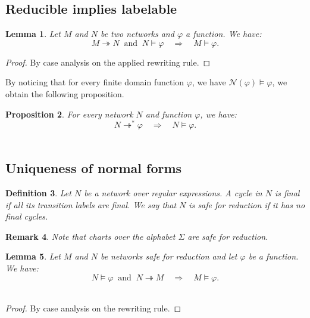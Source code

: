 \documentclass{article}
\newtheorem{definition}{Definition}[section]
\newtheorem{lemma}[definition]{Lemma}
\newtheorem{proposition}[definition]{Proposition}
\newtheorem{corollary}[definition]{Corollary}
\newtheorem{remark}[definition]{Remark}
\newcommand{\milner}[1]{\mathcal{M}(#1)}
\begin{document}
 \subsection{Reducible implies labelable}\label{sec:reducible-implies-decorable}
   \begin{lemma}
     Let $M$ and $N$ be two networks and $\varphi$ a function. We have:
     \[ M\twoheadrightarrow N \ \text{ and }\ N \models \varphi \quad \Longrightarrow \quad M \models \varphi. \]
      \end{lemma}
      \begin{proof}
        By case analysis on the applied rewriting rule.
      \end{proof}

     By noticing that for every finite domain function $\varphi$, we have
     $\mathcal{N}(\varphi)\models \varphi$, we obtain the following proposition.
 \begin{proposition}
    For every network $N$ and function $\varphi$, we have:
    \[ N\twoheadrightarrow^* \varphi \quad \Longrightarrow \quad N \models \varphi.\]~\label{prop:reducible-implies-decorable}~\\[-25pt]
 \end{proposition}





\subsection{Uniqueness of normal forms}\label{sec:uniqueness-of-normal-forms}

  \begin{definition} Let $N$ be a network over regular expressions.
 A cycle in $N$ is \emph{final} if all its transition labels are final. We say that $N$ is \emph{safe for reduction} if it has no final cycles.
 \end{definition}

 \begin{remark} Note that charts over the alphabet $\Sigma$ are safe for reduction.
 \end{remark}

 
  \begin{lemma} Let $M$ and $N$ be networks safe for reduction and let $\varphi$ be  a function. We have:
    \[  N \models \varphi  \ \text{ and }\  N \twoheadrightarrow M\quad \Longrightarrow\quad M \models \varphi.\] ~\label{lem:stable-by-red}
  \end{lemma}
\begin{proof}
  By case analysis on the rewriting rule.
\end{proof}
\end{document}
